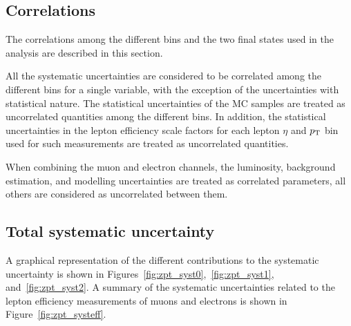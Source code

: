\subsection{Correlations} 
The correlations among the different bins and the two final states used in the 
analysis are described in this section.

All the systematic uncertainties are considered to be correlated among the 
different bins for a single variable, with the exception of the uncertainties with statistical nature. 
The statistical uncertainties of the MC{} samples are treated 
as uncorrelated quantities among the different bins. In addition, the statistical 
uncertainties in the lepton efficiency scale factors for each lepton $\eta$ and $p_{\mathrm{T}}$ 
bin used for such measurements are treated as uncorrelated quantities. 

When combining the muon and electron channels, the luminosity, background estimation, 
and modelling uncertainties are treated as correlated parameters, all others are 
considered as uncorrelated between them.

\subsection{Total systematic uncertainty} 

A graphical representation of the different contributions to the systematic uncertainty 
is shown in Figures~\ref{fig:zpt_syst0},~\ref{fig:zpt_syst1}, and~\ref{fig:zpt_syst2}. 
A summary of the systematic uncertainties related to the lepton efficiency measurements 
of muons and electrons is shown in Figure~\ref{fig:zpt_systeff}.

